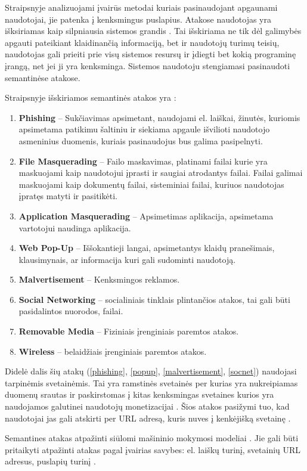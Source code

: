 Straipsnyje  analizuojami įvairūs metodai kuriais pasinaudojant apgaunami naudotojai, jie patenka į kenksmingus puslapius. Atakose naudotojas yra išksiriamas kaip silpniausia sistemos grandis \cite{tax}. Tai išskiriama ne tik dėl galimybės apgauti pateikiant klaidinančią informaciją, bet ir naudotojų turimų teisių, naudotojas gali prieiti prie visų sistemos resursų ir įdiegti bet kokią programinę įrangą, net jei ji yra kenksminga. Sistemos naudotoju stengiamasi pasinaudoti semantinėse atakose.

Straipsnyje išskiriamos semantinės atakos yra \cite{tax}:
\begin{enumerate}
    \item \label{phishing} \textbf{Phishing} -- Sukčiavimas apsimetant, naudojami el. laiškai, žinutės, kuriomis apsimetama patikimu šaltiniu ir siekiama apgaule išvilioti naudotojo asmeninius duomenis, kuriais pasinaudojus bus galima pasipelnyti.
    \item \textbf{File Masquerading} -- Failo maskavimas, platinami failai kurie yra maskuojami kaip naudotojui įprasti ir saugiai atrodantys failai. Failai galimai maskuojami kaip dokumentų failai, sisteminiai failai, kuriuos naudotojas įpratęs matyti ir pasitikėti.
    \item \textbf{Application Masquerading} -- Apsimetimas aplikacija, apsimetama vartotojui naudinga aplikacija.
    \item \label{popup} \textbf{Web Pop-Up} -- Iššokantieji langai, apsimetantys klaidų pranešimais, klausimynais, ar informacija kuri gali sudominti naudotoją.
    \item \label{malvertisement}\textbf{Malvertisement} -- Kenksmingos reklamos.
    \item \label{socnet}\textbf{Social Networking} -- socialiniais tinklais plintančios atakos, tai gali būti pasidalintos nuorodos, failai.
    \item \textbf{Removable Media} -- Fiziniais įrenginiais paremtos atakos.
    \item \textbf{Wireless} -- belaidžiais įrenginiais paremtos atakos.
\end{enumerate}
Didelė dalis šių atakų (\ref{phishing}, \ref{popup}, \ref{malvertisement}, \ref{socnet}) naudojasi tarpinėmis svetainėmis. Tai yra ramstinės svetainės per kurias yra nukreipiamas duomenų srautas ir paskirstomas į kitas kenksmingas svetaines kurios yra naudojamos galutinei naudotojų monetizacijai \cite{linchpins}. Šios atakos pasižymi tuo, kad naudotojai jas gali atskirti per URL adresą, kuris nuves į kenkėjišką svetainę \cite{tax}.

Semantines atakas atpažinti siūlomi mašininio mokymosi modeliai \cite{tax}. Jie gali būti pritaikyti atpažinti atakas pagal įvairias savybes: el. laiškų turinį, svetainių URL adresus, puslapių turinį \cite{tax}.
